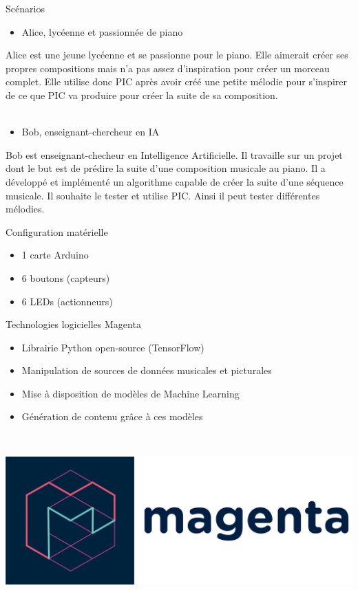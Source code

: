 \documentclass[11pt]{beamer}
\begin{document}
\begin{frame}{Scénarios}
\begin{itemize}
    \item Alice, lycéenne et passionnée de piano
\end{itemize}
Alice est une jeune lycéenne et se passionne pour le piano. Elle aimerait créer ses propres compositions mais n'a pas assez d'inspiration pour créer un morceau complet. Elle utilise donc PIC après avoir créé une petite mélodie pour s'inspirer de ce que PIC va produire pour créer la suite de sa composition.\\~\\

\begin{itemize}
    \item Bob, enseignant-chercheur en IA
\end{itemize}
Bob est enseignant-checheur en Intelligence Artificielle. Il travaille sur un projet dont le but est de prédire la suite d'une composition musicale au piano. Il a développé et implémenté un algorithme capable de créer la suite d'une séquence musicale. Il souhaite le tester et utilise PIC. Ainsi il peut tester différentes mélodies. 
    
\end{frame}

\begin{frame}{Configuration matérielle}
\begin{itemize}
    \item 1 carte Arduino
    \item 6 boutons (capteurs)
    \item 6 LEDs (actionneurs)
\end{itemize}
\end{frame}


\begin{frame}{Technologies logicielles}
Magenta
\begin{itemize}
    \item Librairie Python open-source (TensorFlow) 
    \item Manipulation de sources de données musicales et picturales
    \item Mise à disposition de modèles de Machine Learning
    \item Génération de contenu grâce à ces modèles
\end{itemize}
~\\
\begin{center}
    \includegraphics[scale=0.05]{logo-magenta.png}
\end{center}
    
\end{frame}
\end{document}
